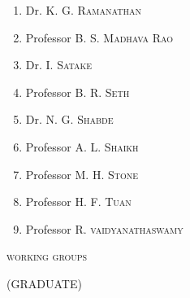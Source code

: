 \begin{enumerate}
\item Dr. \textsc{K. G. Ramanathan}

\item Professor \textsc{B. S. Madhava Rao}

\item Dr. \textsc{I. Satake}

\item Professor \textsc{B. R. Seth}

\item Dr. \textsc{N. G. Shabde}

\item Professor \textsc{A. L. Shaikh}

\item Professor \textsc{M. H. Stone}

\item Professor \textsc{H. F. Tuan}

\item Professor \textsc{R. vaidyanathaswamy}
\end{enumerate}

\begin{center}
{\textsc{working groups}}
\medskip

(GRADUATE)
\end{center}

